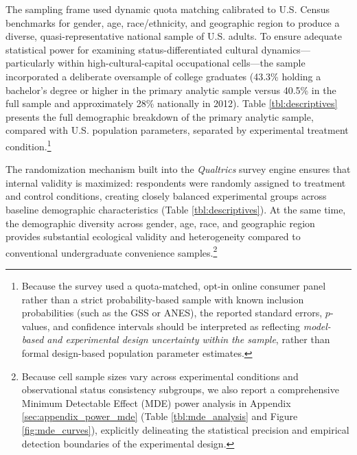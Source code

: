 \documentclass[12pt, letterpaper]{article}
\begin{document}
The sampling frame used dynamic quota matching calibrated to U.S. Census benchmarks for gender, age, race/ethnicity, and geographic region to produce a diverse, quasi-representative national sample of U.S. adults. To ensure adequate statistical power for examining status-differentiated cultural dynamics---particularly within high-cultural-capital occupational cells---the sample incorporated a deliberate oversample of college graduates (43.3\% holding a bachelor's degree or higher in the primary analytic sample versus 40.5\% in the full sample and approximately 28\% nationally in 2012). Table \ref{tbl:descriptives} presents the full demographic breakdown of the primary analytic sample, compared with U.S. population parameters, separated by experimental treatment condition.\footnote{Because the survey used a quota-matched, opt-in online consumer panel rather than a strict probability-based sample with known inclusion probabilities (such as the GSS or ANES), the reported standard errors, $p$-values, and confidence intervals should be interpreted as reflecting \textit{model-based and experimental design uncertainty within the sample}, rather than formal design-based population parameter estimates.}

The randomization mechanism built into the \textit{Qualtrics} survey engine ensures that internal validity is maximized: respondents were randomly assigned to treatment and control conditions, creating closely balanced experimental groups across baseline demographic characteristics (Table \ref{tbl:descriptives}). At the same time, the demographic diversity across gender, age, race, and geographic region provides substantial ecological validity and heterogeneity compared to conventional undergraduate convenience samples.\footnote{Because cell sample sizes vary across experimental conditions and observational status consistency subgroups, we also report a comprehensive Minimum Detectable Effect (MDE) power analysis in Appendix \ref{sec:appendix_power_mde} (Table \ref{tbl:mde_analysis} and Figure \ref{fig:mde_curves}), explicitly delineating the statistical precision and empirical detection boundaries of the experimental design.}
\end{document}
